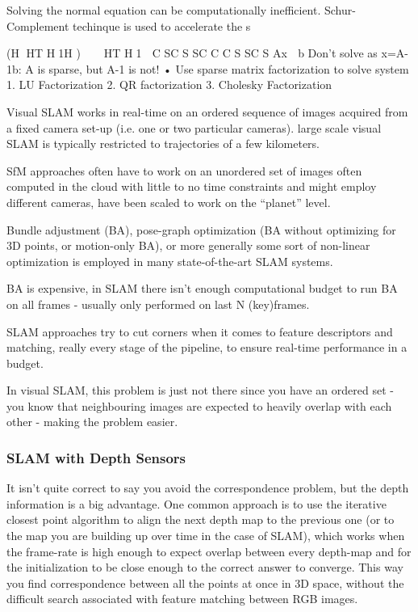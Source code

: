 Solving the normal equation can be computationally inefficient. Schur-Complement techinque is used to accelerate the s

(H 􏰃HT H􏰃1H )􏰌 􏰆􏰐 􏰃􏰐HT H􏰃1 􏰑 C SC S SC C C S SC S
Ax 􏰆 b Don’t solve as x=A-1b: A is sparse, but A-1 is not!
• Use sparse matrix factorization to solve system
1. LU Factorization
2. QR factorization
3. Cholesky Factorization

Visual SLAM works in real-time on an ordered sequence of images acquired from a fixed camera set-up (i.e. one or two particular cameras). 
large scale visual SLAM is typically restricted to trajectories of a few kilometers.

SfM approaches often have to work on an unordered set of images often computed in the cloud with little to no time constraints and might employ different cameras, have been scaled to work on the “planet” level. 

Bundle adjustment (BA), pose-graph optimization (BA without optimizing for 3D points, or motion-only BA), or more generally some sort of non-linear optimization is employed in many state-of-the-art SLAM systems. 

BA is expensive, in SLAM there isn't enough computational budget to run BA on all frames - usually only performed on last N (key)frames. 

SLAM approaches try to cut corners when it comes to feature descriptors and matching, really every stage of the pipeline, to ensure real-time performance in a budget.

In visual SLAM, this problem is just not there since you have an ordered set - you know that neighbouring images are expected to heavily overlap with each other - making the problem easier.

\subsubsection{SLAM with Depth Sensors}

It isn’t quite correct to say you avoid the correspondence problem, but the depth information is a big advantage. One common approach is to use the iterative closest point algorithm to align the next depth map to the previous one (or to the map you are building up over time in the case of SLAM), which works when the frame-rate is high enough to expect overlap between every depth-map and for the initialization to be close enough to the correct answer to converge. This way you find correspondence between all the points at once in 3D space, without the difficult search associated with feature matching between RGB images.

